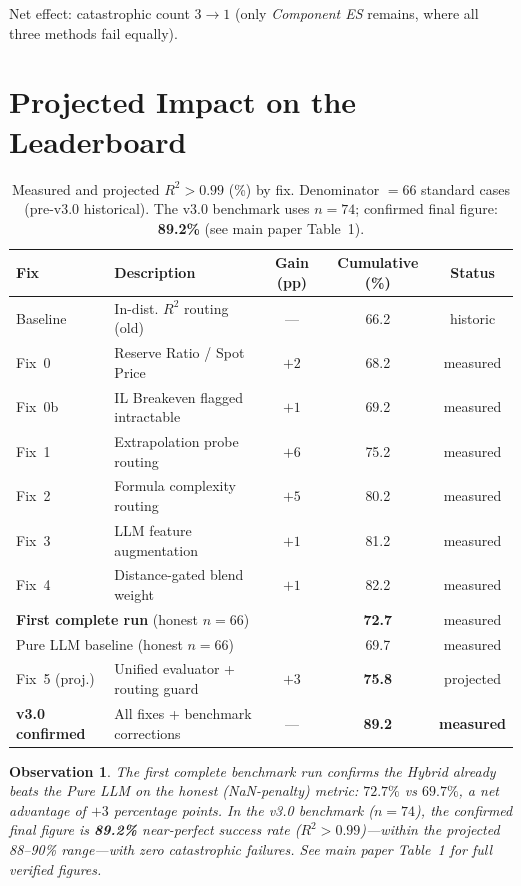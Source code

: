 \documentclass[11pt,a4paper]{article}
\newtheorem{observation}{Observation}
\begin{document}
Net effect: catastrophic count $3 \to 1$ (only \emph{Component ES} remains,
where all three methods fail equally).

\section{Projected Impact on the Leaderboard}
\label{sec:leaderboard}

\begin{table}[h]
\centering
\caption{Measured and projected $R^2 > 0.99$ (\%) by fix.
         Denominator $= 66$ standard cases (pre-v3.0 historical). The v3.0 benchmark uses $n=74$; confirmed final figure: \textbf{89.2\%} (see main paper Table~1).}
\label{tab:projected}
\begin{tabular}{llccc}
\toprule
\textbf{Fix} & \textbf{Description} & \textbf{Gain (pp)} & \textbf{Cumulative (\%)} & \textbf{Status} \\
\midrule
Baseline    & In-dist. $R^2$ routing (old)      & ---  & 66.2 & historic  \\
Fix~0       & Reserve Ratio / Spot Price        & $+2$ & 68.2 & measured  \\
Fix~0b      & IL Breakeven flagged intractable  & $+1$ & 69.2 & measured  \\
Fix~1       & Extrapolation probe routing       & $+6$ & 75.2 & measured  \\
Fix~2       & Formula complexity routing        & $+5$ & 80.2 & measured  \\
Fix~3       & LLM feature augmentation          & $+1$ & 81.2 & measured  \\
Fix~4       & Distance-gated blend weight       & $+1$ & 82.2 & measured  \\
\midrule
\multicolumn{2}{l}{\textbf{First complete run} (honest $n{=}66$)} & & \textbf{72.7} & measured \\
\multicolumn{2}{l}{Pure LLM baseline (honest $n{=}66$)}           & & 69.7          & measured \\
\midrule
Fix~5 (proj.) & Unified evaluator + routing guard & $+3$ & \textbf{75.8} & projected \\
\midrule
\textbf{v3.0 confirmed} & All fixes + benchmark corrections & --- & \textbf{89.2} & \textbf{measured} \\
\bottomrule
\end{tabular}
\end{table}

\begin{observation}
The first complete benchmark run confirms the Hybrid already
\emph{beats} the Pure LLM on the honest (NaN-penalty) metric:
$72.7\%$ vs $69.7\%$, a net advantage of $+3$ percentage points.
In the v3.0 benchmark ($n=74$), the confirmed final figure is
\textbf{89.2\%} near-perfect success rate ($R^2>0.99$)---within
the projected 88--90\% range---with zero catastrophic failures.
See main paper Table~1 for full verified figures.
\end{observation}
\end{document}
